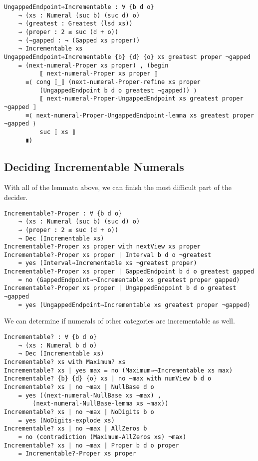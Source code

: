 \documentclass[\main/thesis.tex]{subfiles}
\begin{document}
\begin{lstlisting}[basicstyle=\ttfamily\scriptsize]
UngappedEndpoint⇒Incrementable : ∀ {b d o}
    → (xs : Numeral (suc b) (suc d) o)
    → (greatest : Greatest (lsd xs))
    → (proper : 2 ≤ suc (d + o))
    → (¬gapped : ¬ (Gapped xs proper))
    → Incrementable xs
UngappedEndpoint⇒Incrementable {b} {d} {o} xs greatest proper ¬gapped
    = (next-numeral-Proper xs proper) , (begin
          ⟦ next-numeral-Proper xs proper ⟧
      ≡⟨ cong ⟦_⟧ (next-numeral-Proper-refine xs proper
          (UngappedEndpoint b d o greatest ¬gapped)) ⟩
          ⟦ next-numeral-Proper-UngappedEndpoint xs greatest proper ¬gapped ⟧
      ≡⟨ next-numeral-Proper-UngappedEndpoint-lemma xs greatest proper ¬gapped ⟩
          suc ⟦ xs ⟧
      ∎)
\end{lstlisting}

\subsection{Deciding Incrementable Numerals}

With all of the lemmata above, we can finish the most difficult part
of the decider.

\begin{lstlisting}[basicstyle=\ttfamily\scriptsize]
Incrementable?-Proper : ∀ {b d o}
    → (xs : Numeral (suc b) (suc d) o)
    → (proper : 2 ≤ suc (d + o))
    → Dec (Incrementable xs)
Incrementable?-Proper xs proper with nextView xs proper
Incrementable?-Proper xs proper | Interval b d o ¬greatest
    = yes (Interval⇒Incrementable xs ¬greatest proper)
Incrementable?-Proper xs proper | GappedEndpoint b d o greatest gapped
    = no (GappedEndpoint⇒¬Incrementable xs greatest proper gapped)
Incrementable?-Proper xs proper | UngappedEndpoint b d o greatest ¬gapped
    = yes (UngappedEndpoint⇒Incrementable xs greatest proper ¬gapped)
\end{lstlisting}

We can determine if numerals of other categories are incrementable as well.

\begin{lstlisting}
Incrementable? : ∀ {b d o}
    → (xs : Numeral b d o)
    → Dec (Incrementable xs)
Incrementable? xs with Maximum? xs
Incrementable? xs | yes max = no (Maximum⇒¬Incrementable xs max)
Incrementable? {b} {d} {o} xs | no ¬max with numView b d o
Incrementable? xs | no ¬max | NullBase d o
    = yes ((next-numeral-NullBase xs ¬max) ,
        (next-numeral-NullBase-lemma xs ¬max))
Incrementable? xs | no ¬max | NoDigits b o
    = yes (NoDigits-explode xs)
Incrementable? xs | no ¬max | AllZeros b
    = no (contradiction (Maximum-AllZeros xs) ¬max)
Incrementable? xs | no ¬max | Proper b d o proper
    = Incrementable?-Proper xs proper
\end{lstlisting}
\end{document}
